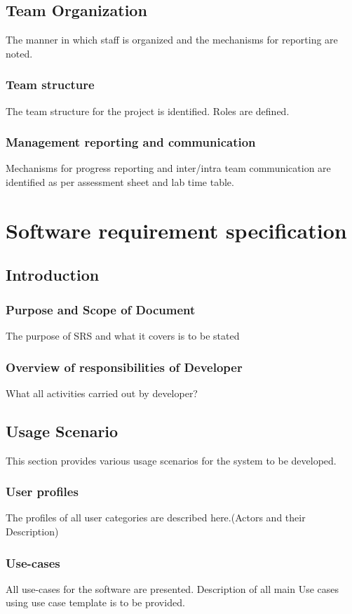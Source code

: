 \documentclass[oneside,a4paper,12pt]{report}
\begin{document}
\section{Team Organization}
The manner in which staff is organized and the mechanisms for reporting are noted.
\subsection{Team structure}
The team structure for the project is identified. Roles are defined.

\subsection{Management reporting and communication}
Mechanisms for progress reporting and inter/intra team communication are identified as per assessment sheet and lab time table.
\chapter{Software requirement specification }

\section{Introduction}
\subsection{Purpose and Scope of Document}
The purpose of SRS and what it covers is to be stated

\subsection{Overview of responsibilities of Developer}
What all activities carried out by developer?

\section{Usage Scenario}
This section provides various usage scenarios for the system to be developed.
 \subsection{User profiles}
The profiles of all user categories are described here.(Actors and their Description)

\subsection{Use-cases}
All use-cases for the software are presented. Description of all main Use cases using use case template is to be provided.
\end{document}
